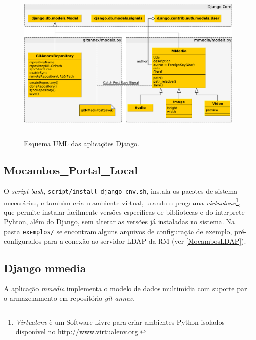 \begin{figure}[htbp]
  \centering
  \includegraphics[width=\textwidth]{./Figure/UML_Schema_Django-crop.pdf}
  \rule{35em}{0.5pt}
  \caption[Esquema UML das aplicações Django]{Esquema UML das aplicações Django.}
  \label{fig:SchemaUMLDjango}
\end{figure}

\subsection{Mocambos\_Portal\_Local}

O \emph{script bash}, \verb|script/install-django-env.sh|, instala os
pacotes de sistema necessários, e também cria o ambiente virtual,
usando o programa \emph{virtualenv}\footnote{\emph{Virtualenv} è um
  Software Livre para criar ambientes Python isolados disponível no
  \url{http://www.virtualenv.org}.}, que permite instalar facilmente
versões específicas de bibliotecas e do interprete Pyhton, além do
Django, sem alterar as versões já instaladas no sistema. Na pasta
\verb|exemplos/| se encontram alguns arquivos de configuração de
exemplo, pré-configurados para a conexão ao servidor LDAP da RM (ver
\ref{MocambosLDAP}).


\subsection{Django mmedia}

A aplicação \emph{mmedia} implementa o modelo de dados multimídia com
suporte par o armazenamento em repositório \emph{git-annex}.

